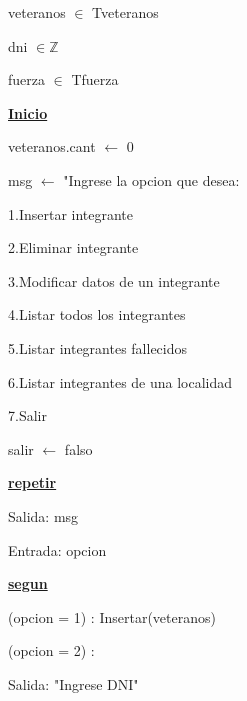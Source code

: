 \documentclass{article}
\begin{document}
    \hspace{4mm}veteranos $\in$ Tveteranos

    \hspace{4mm}dni $\in \mathbb{Z}$

    \hspace{4mm}fuerza $\in$ Tfuerza

    \vspace{4mm}

    \underline{\textbf{Inicio}}

    \hspace{4mm}veteranos.cant $\leftarrow$ 0

    \hspace{4mm}msg $\leftarrow$ "Ingrese la opcion que desea: 

        \hspace{17mm}1.Insertar integrante

        \hspace{17mm}2.Eliminar integrante

        \hspace{17mm}3.Modificar datos de un integrante

        \hspace{17mm}4.Listar todos los integrantes

        \hspace{17mm}5.Listar integrantes fallecidos

        \hspace{17mm}6.Listar integrantes de una localidad

        \hspace{17mm}7.Salir

    \hspace{4mm}salir $\leftarrow$ falso

    \hspace{4mm}\underline{\textbf{repetir}} 

    \hspace{8mm}Salida: msg

    \hspace{8mm}Entrada: opcion

    \hspace{8mm}\underline{\textbf{segun}}

    \hspace{12mm}(opcion = 1) : Insertar(veteranos)

    \hspace{12mm}(opcion = 2) :

        \hspace{16mm}Salida: "Ingrese DNI"
\end{document}
